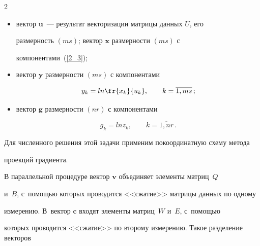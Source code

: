 \begin{multicols}{2}
\begin{itemize}


\item


вектор $\mathbf{u}$~--- результат векторизации матрицы данных $U$, его 


размерность $(ms)$; вектор $\mathbf{x}$ размерности $(ms)$ с 


компонентами~(\ref{2_3});





\item


вектор $\mathbf{y}$ размерности $(ms)$ с компонентами


\begin{equation*}




y_k = ln \fr{x_k}{u_k},\qquad k = \overline{1,ms}\,;


\end{equation*}





\item


вектор $\mathbf{g}$ размерности $(nr)$ с компонентами


\begin{equation*}




g_k = ln z_k,\qquad k = \overline{1,nr}\,.


\end{equation*}


\end{itemize}





Для численного решения этой задачи применим покоординатную схему метода 


проекций градиента.





В параллельной процедуре вектор $\mathbf{v}$ объединяет элементы матриц~$Q$


и~$B$, с~по\-мощью которых проводится <<сжатие>> матрицы данных по одному 


измерению. В~вектор $\mathbf{c}$ входят элементы мат\-риц~$W$ и~$E$, с~по\-мощью 


которых проводится <<сжатие>> по второму измерению. Такое разделение векторов 



\end{multicols}
